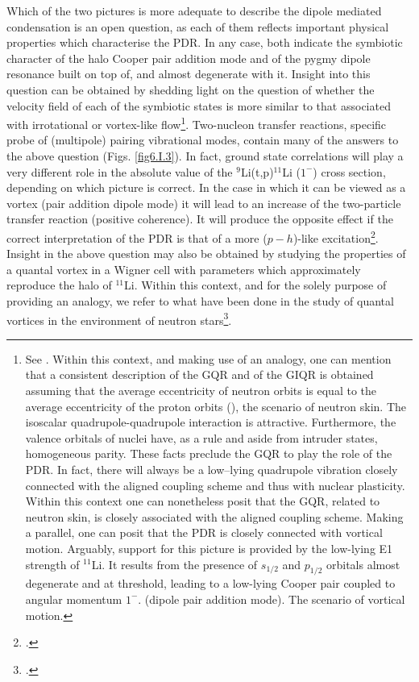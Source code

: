 \begin{subappendices}
Which of the two  pictures is more adequate to describe  the dipole mediated condensation is an open question,  
as each of them reflects  important physical properties which   characterise  the PDR. In any case, both indicate the symbiotic character  of the halo Cooper pair  addition mode  and of the pygmy dipole resonance  built on top of, and almost degenerate with it. 
Insight into this question can be obtained  by shedding light on the question  of whether  the velocity field of each of the symbiotic  states is more similar  to that associated  with irrotational or vortex-like flow\footnote{See \cite{Repko:13}. Within this context, and making use of an analogy, one can  mention that a consistent description of the GQR and of the GIQR is obtained 
assuming that the average eccentricity of neutron orbits 
is equal to the average eccentricity of the proton orbits (\cite{Bes:75c}), the scenario of neutron skin.
The  isoscalar quadrupole-quadrupole interaction is attractive. Furthermore, 
the valence orbitals of nuclei have, as a rule and aside from intruder states, homogeneous parity. These facts  preclude 
the GQR to play the role of the PDR. In fact, there will always be a low--lying quadrupole vibration closely 
connected with the aligned coupling scheme and thus  with nuclear plasticity. Within this context one can  nonetheless  posit  that the GQR, related to neutron skin,  is closely associated with the aligned coupling scheme.
Making a parallel, one can posit  that the PDR is closely connected with vortical motion. 
Arguably,  support for this picture is provided by the   low-lying  E1 
strength of $^{11}$Li. It  results from the presence of $s_{1/2}$ and $p_{1/2}$ orbitals almost degenerate and at threshold, 
leading to a low-lying Cooper pair coupled to angular momentum $1^-$. (dipole pair addition mode). 
The  scenario of vortical motion. }. Two-nucleon transfer reactions, specific probe  of (multipole) pairing vibrational modes, contain many of the answers to the above question (Figs. \ref{fig6.I.3}). 
In fact,  ground state correlations will play a very different role in the absolute value of the $^9$Li(t,p)$^{11}$Li ($1^-$) cross section,
depending  on which picture is correct. In the case in which 
it can be 
 viewed as a vortex (pair addition dipole mode) it will lead to an increase of the two-particle transfer reaction 
 (positive coherence).
 It will  produce the opposite effect if the correct interpretation of the PDR   is that of a 
more ($p-h$)-like excitation\footnote{ \cite{Broglia:71}.}. 
Insight  in the above question may also be obtained by studying  the properties of
a quantal vortex in a Wigner cell with parameters which approximately reproduce 
the halo of $^{11}$Li. Within this context, and  for the solely purpose of providing an analogy, we refer 
to what have been  done in the study of quantal vortices in the environment of neutron stars\footnote{\cite{Avogadro:07,Avogadro:08}.}.



\end{subappendices}
